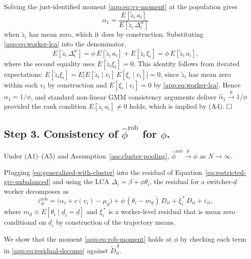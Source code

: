 Solving the just-identified moment \eqref{app:eq:vv-moment} at the population gives
\[
\alpha_1 = \frac{E[\tilde z_i\,a_i]}{E[\tilde z_i\,\Delta_i^w]}
\]
when $\tilde z_i$ has mean zero, which it does by construction.
Substituting \eqref{app:eq:worker-lca} into the denominator,
\[
E[\tilde z_i\,\Delta_i^w] = \phi\, E[\tilde z_i\,a_i] + E[\tilde z_i\,\xi_i] = \phi\, E[\tilde z_i\,a_i],
\]
where the second equality uses $E[\tilde z_i\xi_i] = 0$.
This identity follows from iterated expectations: $E[\tilde z_i\xi_i] = E\!\big[E[\tilde z_i \mid v_i]\,E[\xi_i\mid v_i]\big] = 0$, since $\tilde z_i$ has mean zero within each $v_i$ by construction and $E[\xi_i\mid v_i] = 0$ by \eqref{app:eq:worker-lca}.
Hence $\alpha_1 = 1/\phi$, and standard non-linear GMM consistency arguments \citep{hansen1982large} deliver $\hat\alpha_1 \xrightarrow{p} 1/\phi$ provided the rank condition $E[\tilde z_i\,a_i] \neq 0$ holds, which is implied by (A4). $\hfill\square$

\subsection*{Step 3.  Consistency of \texorpdfstring{$\hat\phi^{\mathrm{rob}}$}{phi-hat-rob} for \texorpdfstring{$\phi$}{phi}.}

\begin{lemma}\label{app:lem:rob}
Under (A1)--(A5) and Assumption~\ref{ass:cluster-pooling}, $\hat\phi^{\mathrm{rob}} \xrightarrow{p} \phi$ as $N \to \infty$.
\end{lemma}

Plugging \eqref{eq:generalized-with-cluster} into the residual of Equation~\eqref{eq:restricted-grc-unbalanced} and using the LCA $\Delta_i = \beta + \phi\theta_i$, the residual for a switcher-$\underline d$ worker decomposes as
\begin{equation}\label{app:eq:residual-decomp}
\varepsilon_{it}^{\mathrm{rob}} = \big(\alpha_i + c(v_i) - \mu_{\underline d}\big) + \phi\,(\theta_i - m_{\underline d})\,D_{it} + \xi_i^{\,*}\,D_{it} + \varepsilon_{it},
\end{equation}
where $m_{\underline d} \equiv E[\theta_i\mid \underline d_i = \underline d]$ and $\xi_i^{\,*}$ is a worker-level residual that is mean zero conditional on $\underline d_i$ by construction of the trajectory means.

We show that the moment \eqref{app:eq:rob-moment} holds at $\phi$ by checking each term in \eqref{app:eq:residual-decomp} against $\tilde D_{it}^{\,\underline d}$.

